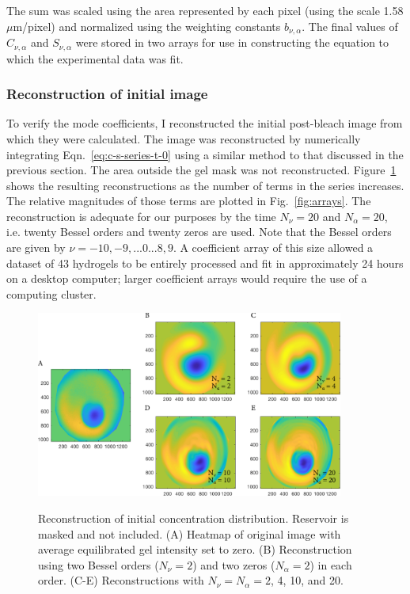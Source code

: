 The sum was scaled using the area represented by each pixel (using the scale 1.58 $\mu$m/pixel) and normalized using the weighting constants $b_{\nu,\alpha}$.  The final values of $C_{\nu,\alpha}$ and $S_{\nu,\alpha}$ were stored in two arrays for use in constructing the equation to which the experimental data was fit.


\subsubsection{Reconstruction of initial image}

To verify the mode coefficients, I reconstructed the initial post-bleach image from which they were calculated.  The image was reconstructed by numerically integrating Eqn.~\ref{eq:c-s-series-t-0} using a similar method to that discussed in the previous section.  The area outside the gel mask was not reconstructed.  Figure~\ref{fig:initDist} shows the resulting reconstructions as the number of terms in the series increases.  The relative magnitudes of those terms are plotted in Fig.~\ref{fig:arrays}.  The reconstruction is adequate for our purposes by the time $N_\nu = 20$ and $N_\alpha = 20$, i.e. twenty Bessel orders and twenty zeros are used.  Note that the Bessel orders are given by $\nu = -10,-9,...0...8,9$.  A coefficient array of this size allowed a dataset of 43 hydrogels to be entirely processed and fit in approximately 24 hours on a desktop computer; larger coefficient arrays would require the use of a computing cluster.

\begin{figure}
\caption[Reconstruction of initial concentration distribution.]{Reconstruction of initial concentration distribution. Reservoir is masked and not included.  (A) Heatmap of original image with average equilibrated gel intensity set to zero. (B) Reconstruction using two Bessel orders ($N_\nu = 2$) and two zeros ($N_\alpha = 2$) in each order. (C-E) Reconstructions with $N_\nu = N_\alpha = 2$, 4, 10, and 20.}
\centering
\includegraphics[width=0.9\textwidth]{figs/ch04/reconstruction-16_2_4_10_20.pdf}
\label{fig:initDist}
\end{figure} 

